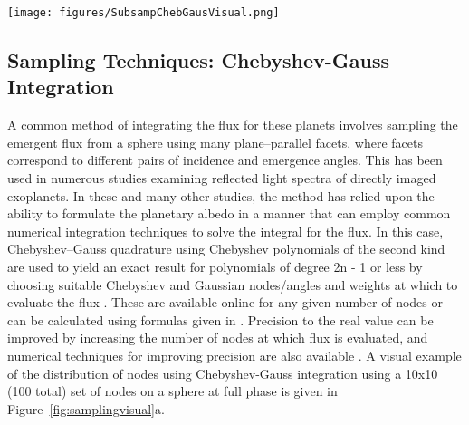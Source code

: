 \documentclass[12pt, letterpaper]{aastex631}
\begin{document}
\begin{figure*}
  \centering
  \texttt{[image: figures/SubsampChebGausVisual.png]}
  \caption{Visual display of sampling methods used in this paper.  The sphere on the left (a) is sampled with 10 by 10 Chebyshev-Gauss points, which can be used to calculate the (visible) disk integrated flux.  The right panel corresponds to the disk subsampling method.  Sampling regions (b, c, and d) are displayed for different subsample choices for an observation vantage equal to sub-solar for b and c and for another case, d, where incidence and emission angle are not coincident due to a symmetry.  Note sub-solar examples are for demonstration and comparison purposes relative to Chebyshev-Gauss sampling, as an exactly sub-solar view geometry would be occulted by the host star.  While near sub-solar geometry would statistically be relatively unlikely at any given time, observations are likely to be optimized for such a geometry given the favorable signal from predominantly dayside reflected light.  }
  \label{fig:samplingvisual}
\end{figure*}

\subsection{Sampling Techniques: Chebyshev-Gauss Integration} \label{subsec:chebgauss}

A common method of integrating the flux for these planets involves sampling the emergent flux from a sphere using many plane--parallel facets, where facets correspond to different pairs of incidence and emergence angles.  This has been used in numerous studies \citep{2010ApJ...724..189C, 2015ApJ...804...94W, 2018ApJ...858...69M} examining reflected light spectra of directly imaged exoplanets. In these and many other studies, the method has relied upon the ability to formulate the planetary albedo in a manner that can employ common numerical integration techniques to solve the integral for the flux. In this case, Chebyshev--Gauss quadrature using Chebyshev polynomials of the second kind are used to yield an exact result for polynomials of degree 2n - 1 or less by choosing suitable Chebyshev and Gaussian nodes/angles and weights at which to evaluate the flux \citep{1950ApJ...112..445H, 1965ApJS...11..373H}.  These are available online for any given number of nodes or can be calculated using formulas given in \textcite{2015ApJ...804...94W}.  Precision to the real value can be improved by increasing the number of nodes at which flux is evaluated, and numerical techniques for improving precision are also available \citep{DEHGHAN2005431}.  A visual example of the distribution of nodes using Chebyshev-Gauss integration using a 10x10 (100 total) set of nodes on a sphere at full phase is given in Figure~\ref{fig:samplingvisual}a. 
\end{document}
